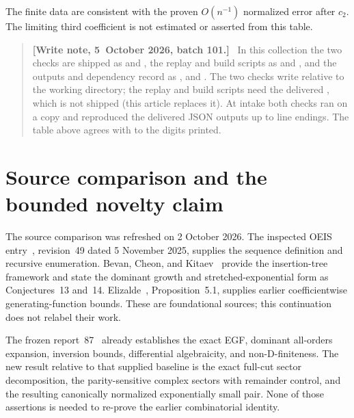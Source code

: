 \documentclass[11pt]{article}
\theoremstyle{remark}\newtheorem{remark}[theorem]{Remark}
\newenvironment{writenoteb}{\begin{quote}\small\raggedright\textbf{[Write note, 5~October 2026, batch 101.]}\ }{\end{quote}}
\begin{document}
The finite data are consistent with the proven $O(n^{-1})$ normalized error after $c_2$. The limiting third coefficient is not estimated or asserted from this table.
\begin{writenoteb}
In this collection the two checks are shipped as
 and
, the replay and build
scripts as  and ,
and the outputs and dependency record as
,
 and
. The two checks write
 relative to the working directory; the replay and
build scripts need the delivered , which is not shipped
(this article replaces it). At intake both checks ran on a copy and
reproduced the delivered JSON outputs up to line endings. The table above
agrees with  to the digits printed.
\end{writenoteb}

\section{Source comparison and the bounded novelty claim}\label{vav:hk:sec:sources}
The source comparison was refreshed on 2 October 2026. The inspected OEIS entry~\cite{oeis}, revision~49 dated 5 November 2025, supplies the sequence definition and recursive enumeration. Bevan, Cheon, and Kitaev~\cite{bck} provide the insertion-tree framework and state the dominant growth and stretched-exponential form as Conjectures~13 and~14. Elizalde~\cite{elizalde}, Proposition~5.1, supplies earlier coefficientwise generating-function bounds. These are foundational sources; this continuation does not relabel their work.

The frozen report~87~\cite{hkprior} already establishes the exact EGF, dominant all-orders expansion, inversion bounds, differential algebraicity, and non-D-finiteness. The new result relative to that supplied baseline is the exact full-cut sector decomposition, the parity-sensitive complex sectors with remainder control, and the resulting canonically normalized exponentially small pair. None of those assertions is needed to re-prove the earlier combinatorial identity.
\end{document}
